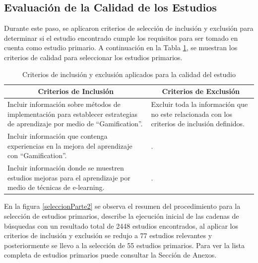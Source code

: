 \documentclass{report}
\begin{document}
            \subsection{Evaluación de la Calidad de los Estudios}
            Durante este paso, se aplicaron criterios de selección de inclusión y exclusión para determinar si el estudio encontrado cumple los requisitos para ser tomado en cuenta como estudio primario. A continuación en la Tabla \ref{table:CriteriosInclusionExclusionCalidad}, se muestran los criterios de calidad para seleccionar los estudios primarios.
            
            \begin{table}[H]
                \begin{center}
                    \caption{Criterios de inclusión y exclusión aplicados para la calidad del estudio}
                    \label{table:CriteriosInclusionExclusionCalidad}
                    \begin{tabular}{| p{7cm} | p{7cm} |}
                        \toprule
                        \hline
                        \multicolumn{1}{|c|}{\textbf{Criterios de Inclusión}} & \multicolumn{1}{|c|}{\textbf{Criterios de Exclusión}} \\
                        \hline
                        Incluir información sobre métodos de implementación para establecer estrategias de aprendizaje por medio de ``Gamification''.{ }& Excluir toda la información que no este relacionada con los criterios de inclusión definidos.\\
                        \hline
                        Incluir información que contenga experiencias en la mejora del aprendizaje con ``Gamification''. &{.} \\
                        \hline
                        Incluir información donde se muestren estudios mejoras para el aprendizaje por medio de técnicas de e-learning.& {.}\\ \hline
                    \end{tabular}
                \end{center}
            \end{table}
            
            En la figura \ref{seleccionParte2}  se observa el resumen del procedimiento para la selección de estudios primarios, describe la ejecución inicial de las cadenas de búsquedas con un resultado total de 2448 estudios encontrados, al aplicar los criterios de inclusión y exclusión se redujo a 77 estudios relevantes y posteriormente se llevo a la selección de 55 estudios primarios. Para ver la lista completa de estudios primarios puede consultar la Sección de Anexos.
            
\end{document}
